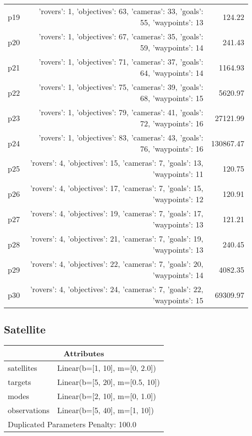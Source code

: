 \documentclass{article}
\begin{document}
\begin{center}
\begin{tabular}{@{}l|r|r@{}}
  p19&{'rovers': 1, 'objectives': 63, 'cameras': 33, 'goals': 55, 'waypoints': 13}&124.22\\
  p20&{'rovers': 1, 'objectives': 67, 'cameras': 35, 'goals': 59, 'waypoints': 14}&241.43\\
  p21&{'rovers': 1, 'objectives': 71, 'cameras': 37, 'goals': 64, 'waypoints': 14}&1164.93\\
  p22&{'rovers': 1, 'objectives': 75, 'cameras': 39, 'goals': 68, 'waypoints': 15}&5620.97\\
  p23&{'rovers': 1, 'objectives': 79, 'cameras': 41, 'goals': 72, 'waypoints': 16}&27121.99\\
  p24&{'rovers': 1, 'objectives': 83, 'cameras': 43, 'goals': 76, 'waypoints': 16}&130867.47\\
  p25&{'rovers': 4, 'objectives': 15, 'cameras': 7, 'goals': 13, 'waypoints': 11}&120.75\\
  p26&{'rovers': 4, 'objectives': 17, 'cameras': 7, 'goals': 15, 'waypoints': 12}&120.91\\
  p27&{'rovers': 4, 'objectives': 19, 'cameras': 7, 'goals': 17, 'waypoints': 13}&121.21\\
  p28&{'rovers': 4, 'objectives': 21, 'cameras': 7, 'goals': 19, 'waypoints': 13}&240.45\\
  p29&{'rovers': 4, 'objectives': 22, 'cameras': 7, 'goals': 20, 'waypoints': 14}&4082.35\\
  p30&{'rovers': 4, 'objectives': 24, 'cameras': 7, 'goals': 22, 'waypoints': 15}&69309.97
                            \end{tabular}
                            \end{center}
                    
                            \newpage \subsection{Satellite}
                    \begin{center}
                    \begin{tabular}{@{}p{}p{}@{}}
                    \multicolumn{2}{c}{\bf \large Attributes}\\\midrule
                    satellites & Linear(b=[1, 10], m=[0, 2.0])\\
targets & Linear(b=[5, 20], m=[0.5, 10])\\
modes & Linear(b=[2, 10], m=[0, 1.0])\\
observations & Linear(b=[5, 40], m=[1, 10]) \\\midrule
                    \multicolumn{2}{l}{Duplicated Parameters Penalty: 100.0}
                    \end{tabular}
                    \end{center}
                
\end{document}
